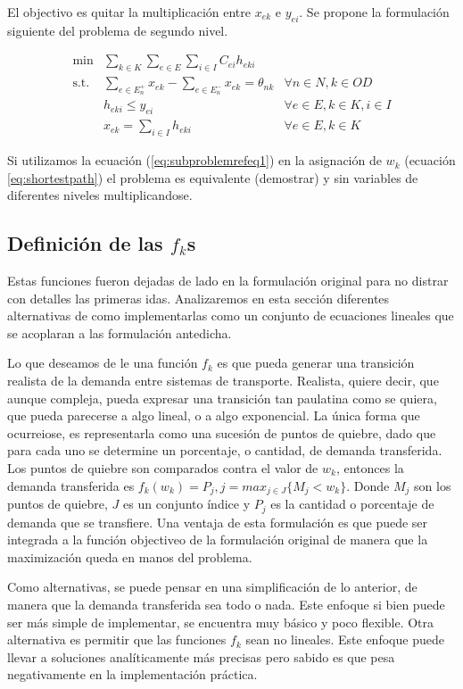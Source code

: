 \documentclass{article}
\begin{document}
  El objectivo es quitar la multiplicación entre $x_{ek}$ e $y_{ei}$. Se propone la formulación siguiente del problema de segundo nivel.

  \begin{align}
    \text{min}  & \sum_{k \in K} \sum_{e \in E} \sum_{i \in I} C_{ei} h_{eki}                     & \label{eq:subproblemrefeq1} \\
    \text{s.t.} & \sum_{e \in E_n^+} x_{ek} - \sum_{e \in E_n^-} x_{ek} = \theta_{nk} & \forall n \in N, k \in OD \\
                & h_{eki} \leq y_{ei}                                                 & \forall e \in E, k \in K, i \in I \\
                & x_{ek} = \sum_{i \in I} h_{eki}                                     & \forall e \in E, k \in K
  \end{align}

  Si utilizamos la ecuación (\ref{eq:subproblemrefeq1}) en la asignación de $w_k$ (ecuación \ref{eq:shortestpath}) el problema es equivalente (demostrar) y sin variables de diferentes niveles multiplicandose.

  \subsection*{Definición de las $f_k$s}

  Estas funciones fueron dejadas de lado en la formulación original para no distrar con detalles las primeras idas. Analizaremos en esta sección diferentes alternativas de como implementarlas como un conjunto de ecuaciones lineales que se acoplaran a las formulación antedicha.

  Lo que deseamos de le una función $f_k$ es que pueda generar una transición realista de la demanda entre sistemas de transporte. Realista, quiere decir, que aunque compleja, pueda expresar una transición tan paulatina como se quiera, que pueda parecerse a algo lineal, o a algo exponencial. La única forma que ocurreiose, es representarla como una sucesión de puntos de quiebre, dado que para cada uno se determine un porcentaje, o cantidad, de demanda transferida. Los puntos de quiebre son comparados contra el valor de $w_k$, entonces la demanda transferida es $f_k(w_k) = P_j, j = max_{j \in J} \{M_j < w_k\}$. Donde $M_j$ son los puntos de quiebre, $J$ es un conjunto índice y $P_j$ es la cantidad o porcentaje de demanda que se transfiere. Una ventaja de esta formulación es que puede ser integrada a la función objectiveo de la formulación original de manera que la maximización queda en manos del problema.

  Como alternativas, se puede pensar en una simplificación de lo anterior, de manera que la demanda transferida sea todo o nada. Este enfoque si bien puede ser más simple de implementar, se encuentra muy básico y poco flexible. Otra alternativa es permitir que las funciones $f_k$ sean no lineales. Este enfoque puede llevar a soluciones analíticamente más precisas pero sabido es que pesa negativamente en la implementación práctica.
\end{document}
